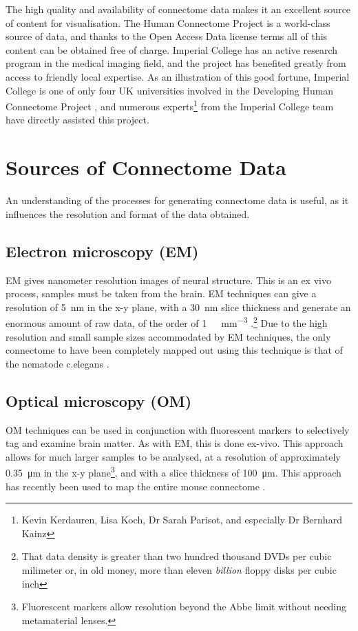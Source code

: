 \documentclass[MSc,paper=a4,pagesize=auto]{icldt}
\begin{document}
The high quality and availability of connectome data makes it an excellent source of content for visualisation. The Human Connectome Project is a world-class source of data, and thanks to the Open Access Data license terms \cite{HCPAccess2014} all of this content can be obtained free of charge. Imperial College has an active research program in the medical imaging field, and the project has benefited greatly from access to friendly local expertise. As an illustration of this good fortune, Imperial College is one of only four UK universities involved in the Developing Human Connectome Project \cite{DHCPPartners2014}, and numerous experts\footnote{Kevin Kerdauren, Lisa Koch, Dr Sarah Parisot, and especially Dr Bernhard  Kainz} from the Imperial College team have directly assisted this project. 

\section{Sources of Connectome Data}
An understanding of the processes for generating connectome data is useful, as it influences the resolution and format of the data obtained. 

\subsection{Electron microscopy (EM)} 
EM gives nanometer resolution images of neural structure. This is an ex vivo process, samples must be taken from the brain. EM techniques can give a resolution of \SI{5}{\nm} in the x-y plane, with a \SI{30}{\nm} slice thickness and generate an enormous amount of raw data, of the order of \SI{1}{\pebi\byte\per\mm\cubed} \cite{Jeong2010}.\footnote{That data density is greater than two hundred thousand DVDs per cubic milimeter or, in old money, more than eleven \textit{billion} floppy disks per cubic inch} Due to the high resolution and small sample sizes accommodated by EM techniques, the only connectome to have been completely mapped out using this technique is that of the nematode c.elegans \cite{White1986}.

\subsection{Optical microscopy (OM)} 
OM techniques can be used in conjunction with fluorescent markers to selectively tag and examine brain matter. As with EM, this is done ex-vivo. This approach allows for much larger samples to be analysed, at a resolution of approximately \SI{0.35}{\um} in the x-y plane\footnote{Fluorescent markers allow resolution beyond the Abbe limit without needing metamaterial lenses.}, and with a slice thickness of \SI{100}{\um}. This approach has recently been used to map the entire mouse connectome \cite{Oh2014}. 
\end{document}
